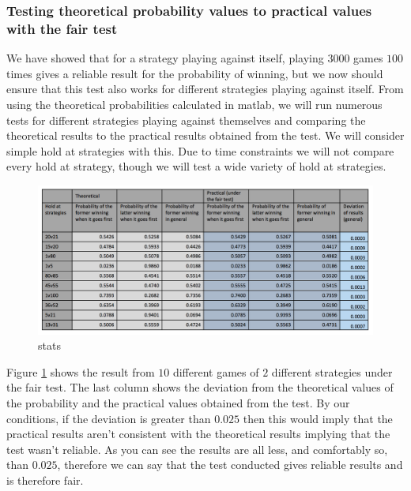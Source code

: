 \documentclass[a4paper,titlepage]{article}
\begin{document}
\subsubsection{Testing theoretical probability values to practical values with the fair test}
We have showed that for a strategy playing against itself, playing $3000$ games $100$ times gives a reliable result for the probability of winning, but we now should ensure that this test also works for different strategies playing against itself. From using the theoretical probabilities calculated in matlab, we will run numerous tests for different strategies playing against themselves and comparing the theoretical results to the practical results obtained from the test. We will consider simple hold at strategies with this. Due to time constraints we will not compare every hold at strategy, though we will test a wide variety of hold at strategies.
\begin{figure}
\centering
\includegraphics[width=\textwidth]{stats_table}
\caption{stats\label{figure6}}
\end{figure}
Figure \ref{figure6} shows the result from $10$ different games of $2$ different strategies under the fair test. The last column shows the deviation from the theoretical values of the probability and the practical values obtained from the test. By our conditions, if the deviation is greater than $0.025$ then this would imply that the practical results aren’t consistent with the theoretical results implying that the test wasn’t reliable. As you can see the results are all less, and comfortably so, than $0.025$, therefore we can say that the test conducted gives reliable results and is therefore fair.
\end{document}
